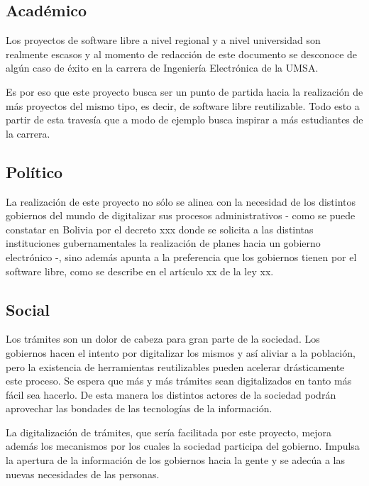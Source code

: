 \subsection{Académico}
Los proyectos de software libre a nivel regional y a nivel universidad son
realmente escasos y al momento de redacción de este documento se desconoce de
algún caso de éxito en la carrera de Ingeniería Electrónica de la UMSA.

Es por eso que este proyecto busca ser un punto de partida hacia la realización
de más proyectos del mismo tipo, es decir, de software libre reutilizable. Todo
esto a partir de esta travesía que a modo de ejemplo busca inspirar a más
estudiantes de la carrera.

\subsection{Político}
La realización de este proyecto no sólo se alinea con la necesidad de los
distintos gobiernos del mundo de digitalizar sus procesos administrativos - como
se puede constatar en Bolivia por el decreto xxx donde se solicita a las
distintas instituciones gubernamentales la realización de planes hacia un
gobierno electrónico -, sino además apunta a la preferencia que los gobiernos
tienen por el software libre, como se describe en el artículo xx de la ley xx.

\subsection{Social}
Los trámites son un dolor de cabeza para gran parte de la sociedad. Los
gobiernos hacen el intento por digitalizar los mismos y así aliviar a la
población, pero la existencia de herramientas reutilizables pueden acelerar
drásticamente este proceso. Se espera que más y más trámites sean digitalizados
en tanto más fácil sea hacerlo. De esta manera los distintos actores de la
sociedad podrán aprovechar las bondades de las tecnologías de la información.

La digitalización de trámites, que sería facilitada por este proyecto, mejora
además los mecanismos por los cuales la sociedad participa del gobierno. Impulsa
la apertura de la información de los gobiernos hacia la gente y se adecúa a las
nuevas necesidades de las personas.